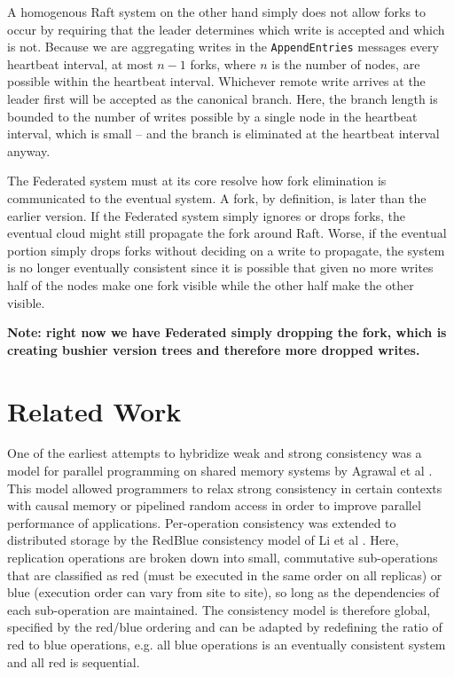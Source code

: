 \documentclass[10pt,conference,letterpaper]{IEEEtran}
\begin{document}
A homogenous Raft system on the other hand simply does not allow forks to occur by requiring that the leader determines which write is accepted and which is not. Because we are aggregating writes in the \texttt{AppendEntries} messages every heartbeat interval, at most $n-1$ forks, where $n$ is the number of nodes, are possible within the heartbeat interval. Whichever remote write arrives at the leader first will be accepted as the canonical branch. Here, the branch length is bounded to the number of writes possible by a single node in the heartbeat interval, which is small -- and the branch is eliminated at the heartbeat interval anyway.

The Federated system must at its core resolve how fork elimination is communicated to the eventual system. A fork, by definition, is later than the earlier version. If the Federated system simply ignores or drops forks, the eventual cloud might still propagate the fork around Raft. Worse, if the eventual portion simply drops forks without deciding on a write to propagate, the system is no longer eventually consistent since it is possible that given no more writes half of the nodes make one fork visible while the other half make the other visible.

\textbf{Note: right now we have Federated simply dropping the fork, which is creating bushier version trees and therefore more dropped writes.}

\section{Related Work}

One of the earliest attempts to hybridize weak and strong consistency was a model for parallel programming on shared memory systems by Agrawal et al \cite{agrawal_mixed_1994}. This model allowed programmers to relax strong consistency in certain contexts with causal memory or pipelined random access in order to improve parallel performance of applications. Per-operation consistency was extended to distributed storage by the RedBlue consistency model of Li et al \cite{li_making_2012}. Here, replication operations are broken down into small, commutative sub-operations that are classified as red (must be executed in the same order on all replicas) or blue (execution order can vary from site to site), so long as the dependencies of each sub-operation are maintained. The consistency model is therefore global, specified by the red/blue ordering and can be adapted by redefining the ratio of red to blue operations, e.g. all blue operations is an eventually consistent system and all red is sequential.
\end{document}
